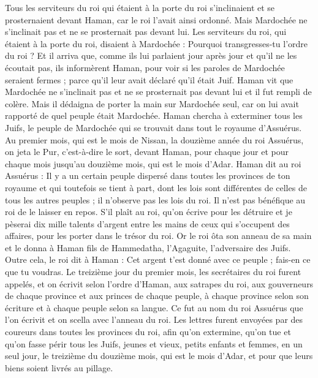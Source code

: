\begin{multicols}{2}
Tous les serviteurs du roi qui étaient à la porte du roi s'inclinaient et se prosternaient devant Haman, car le roi l'avait ainsi ordonné. Mais Mardochée ne s'inclinait pas et ne se prosternait pas devant lui.
Les serviteurs du roi, qui étaient à la porte du roi, disaient à Mardochée : Pourquoi transgresses-tu l'ordre du roi ?
Et il arriva que, comme ils lui parlaient jour après jour et qu'il ne les écoutait pas, ils informèrent Haman, pour voir si les paroles de Mardochée seraient fermes ; parce qu'il leur avait déclaré qu'il était Juif.
Haman vit que Mardochée ne s'inclinait pas et ne se prosternait pas devant lui et il fut rempli de colère.
Mais il dédaigna de porter la main sur Mardochée seul, car on lui avait rapporté de quel peuple était Mardochée. Haman chercha à exterminer tous les Juifs, le peuple de Mardochée qui se trouvait dans tout le royaume d'Assuérus.
Au premier mois, qui est le mois de Nissan, la douzième année du roi Assuérus, on jeta le Pur, c'est-à-dire le sort, devant Haman, pour chaque jour et pour chaque mois jusqu'au douzième mois, qui est le mois d'Adar.
Haman dit au roi Assuérus : Il y a un certain peuple dispersé dans toutes les provinces de ton royaume et qui toutefois se tient à part, dont les lois sont différentes de celles de tous les autres peuples ; il n'observe pas les lois du roi. Il n'est pas bénéfique au roi de le laisser en repos.
S'il plaît au roi, qu'on écrive pour les détruire et je pèserai dix mille talents d'argent entre les mains de ceux qui s'occupent des affaires, pour les porter dans le trésor du roi.
Or le roi ôta son anneau de sa main et le donna à Haman fils de Hammedatha, l'Agaguite, l'adversaire des Juifs.
Outre cela, le roi dit à Haman : Cet argent t'est donné avec ce peuple ; fais-en ce que tu voudras.
Le treizième jour du premier mois, les secrétaires du roi furent appelés, et on écrivit selon l'ordre d'Haman, aux satrapes du roi, aux gouverneurs de chaque province et aux princes de chaque peuple, à chaque province selon son écriture et à chaque peuple selon sa langue. Ce fut au nom du roi Assuérus que l'on écrivit et on scella avec l'anneau du roi.
Les lettres furent envoyées par des coureurs dans toutes les provinces du roi, afin qu'on extermine, qu'on tue et qu'on fasse périr tous les Juifs, jeunes et vieux, petits enfants et femmes, en un seul jour, le treizième du douzième mois, qui est le mois d'Adar, et pour que leurs biens soient livrés au pillage.

\end{multicols}
